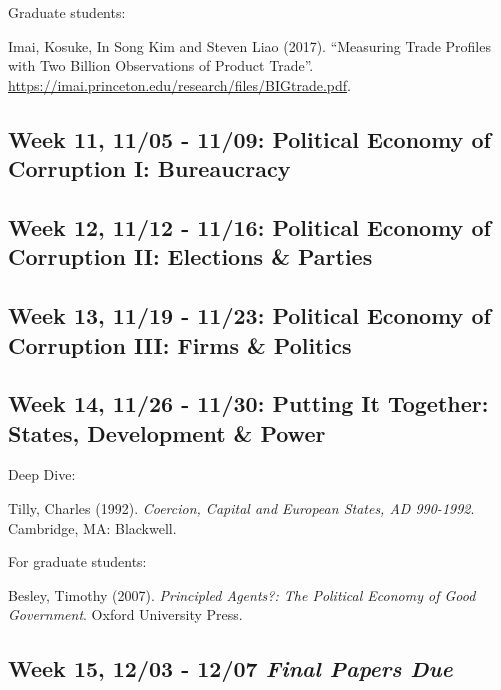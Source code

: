 \documentclass[11pt,]{article}
\begin{document}
Graduate students:

Imai, Kosuke, In Song Kim and Steven Liao (2017). ``Measuring Trade
Profiles with Two Billion Observations of Product Trade''.
\url{https://imai.princeton.edu/research/files/BIGtrade.pdf}.

\subsection{Week 11, 11/05 - 11/09: Political Economy of Corruption I:
Bureaucracy}\label{week-11-1105---1109-political-economy-of-corruption-i-bureaucracy}

\subsection{Week 12, 11/12 - 11/16: Political Economy of Corruption II:
Elections \&
Parties}\label{week-12-1112---1116-political-economy-of-corruption-ii-elections-parties}

\subsection{Week 13, 11/19 - 11/23: Political Economy of Corruption III:
Firms \&
Politics}\label{week-13-1119---1123-political-economy-of-corruption-iii-firms-politics}

\subsection{Week 14, 11/26 - 11/30: Putting It Together: States,
Development \&
Power}\label{week-14-1126---1130-putting-it-together-states-development-power}

Deep Dive:

Tilly, Charles (1992).
\emph{Coercion, Capital and European States, AD 990-1992}. Cambridge,
MA: Blackwell.

For graduate students:

Besley, Timothy (2007).
\emph{Principled Agents?: The Political Economy of Good Government}.
Oxford University Press.

\subsection{\texorpdfstring{Week 15, 12/03 - 12/07 \emph{Final Papers
Due}}{Week 15, 12/03 - 12/07 Final Papers Due}}\label{week-15-1203---1207-final-papers-due}
\end{document}
